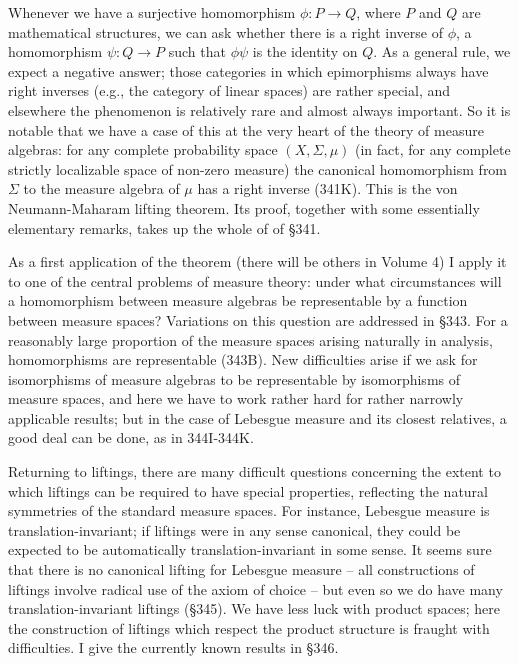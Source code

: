 
\def\chaptername{The lifting theorem}


Whenever we have a surjective homomorphism $\phi:P\to Q$, where $P$ and
$Q$ are mathematical structures, we can ask whether there is a right
inverse of $\phi$, a homomorphism $\psi:Q\to P$ such that $\phi\psi$ is
the identity on $Q$.   As a general rule, we expect a negative answer;
those categories in which epimorphisms always have right inverses (e.g.,
the category of linear spaces) are rather special, and elsewhere the
phenomenon is relatively rare and almost always important.   So it is
notable that we have a case of this at the very heart of the theory of
measure algebras:  for any complete probability space $(X,\Sigma,\mu)$
(in fact, for any complete strictly localizable space of non-zero
measure) the canonical homomorphism from $\Sigma$ to the measure algebra
of $\mu$ has a right inverse (341K).   This is the von Neumann-Maharam
lifting theorem.   Its proof, together with some essentially elementary
remarks, takes up the whole of of \S341.

As a first application of the theorem (there will be others in Volume
4) I apply it to one of the central problems of measure theory:  under
what circumstances will a homomorphism between measure algebras be
representable by a function between measure spaces?   Variations on this
question are addressed in \S343.   For a reasonably large proportion of
the measure spaces arising naturally in analysis, homomorphisms are
representable (343B).   New difficulties arise if we ask for
isomorphisms of measure algebras to be representable by isomorphisms of
measure spaces, and here we have to work rather hard for rather narrowly
applicable results;  but in the case of Lebesgue measure and its
closest relatives, a good deal can be done, as in 
344I-344K.  %

Returning to liftings, there are many difficult questions concerning the
extent to which liftings can be required to have special properties,
reflecting the natural symmetries of the standard measure spaces.   For
instance, Lebesgue measure is translation-invariant;  if liftings were
in any sense canonical, they could be expected to be automatically
translation-invariant in some sense.   It seems sure that there is no
canonical lifting for Lebesgue measure -- all constructions of liftings
involve radical use of the axiom of choice -- but even so we do have
many translation-invariant liftings (\S345).   We have less luck with
product spaces;  here the construction of liftings which respect the
product structure is fraught with difficulties.   I give the currently
known results in \S346.


\discrpage


